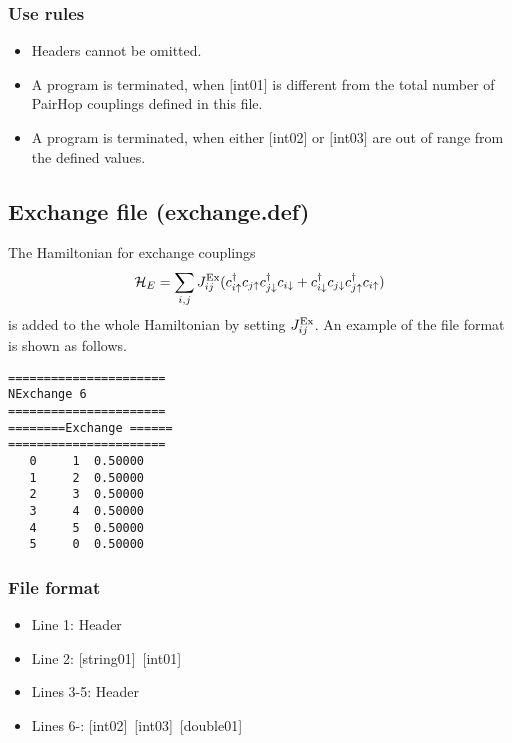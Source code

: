 \subsubsection{Use rules}
\begin{itemize}
\item Headers cannot be omitted. 
\item A program is terminated, when $[$int01$]$ is different from the total number of PairHop couplings defined in this file.
\item A program is terminated, when either $[$int02$]$ or $[$int03$]$ are out of range from the defined values.
\end{itemize}

\newpage
\subsection{Exchange file (exchange.def)} 
The Hamiltonian for exchange couplings 
\begin{equation}
{\cal H}_E  =\sum_{i,j}J_{ij}^{\rm Ex} (c_ {i \uparrow}^{\dag}c_{j\uparrow}c_{j \downarrow}^{\dag}c_{i  \downarrow}+c_ {i \downarrow}^{\dag}c_{j\downarrow}c_{j \uparrow}^{\dag}c_{i  \uparrow})
\end{equation}
is added to the whole Hamiltonian by setting $J_{ij}^{\rm Ex}$.
An example of the file format is shown as follows.

\begin{minipage}{12.5cm}
\begin{screen}
\begin{verbatim}
====================== 
NExchange 6  
====================== 
========Exchange ====== 
====================== 
   0     1  0.50000
   1     2  0.50000
   2     3  0.50000
   3     4  0.50000
   4     5  0.50000
   5     0  0.50000
\end{verbatim}
\end{screen}
\end{minipage}

\subsubsection{File format}
 \begin{itemize}
   \item  Line 1:  Header
   \item  Line 2:   [string01]~[int01]
   \item  Lines 3-5:  Header
   \item  Lines 6-: 
   [int02]~[int03]~[double01] 
  \end{itemize}

